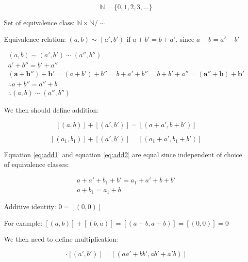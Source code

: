 \documentclass{article}
\begin{document}
    \begin{displaymath}
        \mathbb{N} = \{ 0, 1, 2, 3, \ldots \}
    \end{displaymath}
    
    Set of equivalence class: $\mathbb{N} \times \mathbb{N} / \sim$
    
    Equivalence relation: $(a, b) \sim (a', b')$ if $a + b' = b + a'$, since $a - b = a' - b'$
    
    \begin{gather*}
        (a, b) \sim (a', b') \sim (a'', b'') \\
        a' + b'' = b' + a'' \\
        \boldsymbol{(a + b'') + b'} = (a + b') + b''
        = b + a' + b'' = b + b' + a'' = \boldsymbol{(a'' + b) + b'} \\
        \therefore a + b'' = a'' + b \\
        \therefore (a, b) \sim (a'', b'')
    \end{gather*}
    
    We then should define addition:
    
    \begin{equation} \label{eq:add1}
        [(a, b)] + [(a', b')] = [(a + a', b + b')]
    \end{equation}
    
    \begin{equation} \label{eq:add2}
        [(a_{1}, b_{1})] + [(a', b')] = [(a_{1} + a', b_{1} + b')]
    \end{equation}
    
    Equation \ref{eq:add1} and equation \ref{eq:add2} are equal since independent of choice of equivalence classes:
    
    \begin{gather*}
        a + a' + b_{1} + b' = a_{1} + a' + b + b' \\
        a + b_{1} = a_{1} + b
    \end{gather*}
    
    Additive identity: $0 = [(0, 0)]$
    
    For example: $[(a, b)] + [(b, a)] = [(a + b, a + b)] = [(0, 0)] = 0$
    
    We then need to define multiplication:
    
    \begin{displaymath}
        [(a, b)] \cdot [(a', b')] = [(aa' + bb', ab' + a'b)]
    \end{displaymath}
    
\end{document}
